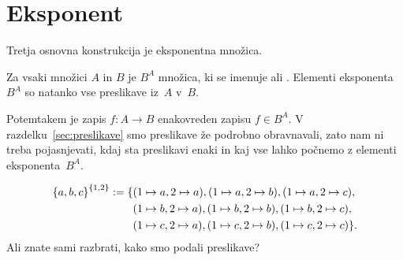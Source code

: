 




\section{Eksponent}
\label{sec:eksponent}

Tretja osnovna konstrukcija je eksponentna množica.

\begin{pravilo}
  \label{pravilo:eksponent}%
  Za vsaki množici $A$ in $B$ je $B^A$ množica, ki se imenuje  ali
  .
  Elementi eksponenta $B^A$ so natanko vse preslikave iz~$A$ v~$B$.
\end{pravilo}

Potemtakem je zapis $f : A \to B$ enakovreden zapisu $f \in B^A$.
%
V razdelku~\ref{sec:preslikave} smo preslikave že podrobno obravnavali, zato nam ni treba pojasnjevati, kdaj sta preslikavi enaki in kaj vse lahko počnemo z elementi eksponenta~$B^A$.

\begin{zgled}
  \begin{align*}
    \left\{a, b, c\right\}^{\left\{1, 2\right\}} \mathrel{{:}{=}} \{
      &(1 \mapsto a, 2 \mapsto a),
      (1 \mapsto a, 2 \mapsto b),
      (1 \mapsto a, 2 \mapsto c), \\
      &(1 \mapsto b, 2 \mapsto a),
      (1 \mapsto b, 2 \mapsto b),
      (1 \mapsto b, 2 \mapsto c), \\
      &(1 \mapsto c, 2 \mapsto a),
      (1 \mapsto c, 2 \mapsto b),
      (1 \mapsto c, 2 \mapsto c) \}.
  \end{align*}
  Ali znate sami razbrati, kako smo podali preslikave?
\end{zgled}

